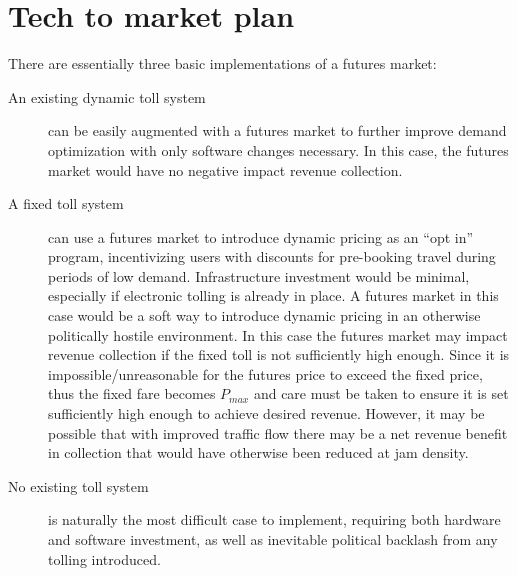 \documentclass{article}
\begin{document}
\section{Tech to market plan}
There are essentially three basic implementations of a futures market:
\begin{description}
    \item[An existing dynamic toll system] can be easily augmented with a futures market to further improve demand optimization with only software changes necessary. In this case, the futures market would have no negative impact revenue collection. 
    
    \item[A fixed toll system] can use a futures market to introduce dynamic pricing as an ``opt in'' program, incentivizing users with discounts for pre-booking travel during periods of low demand. Infrastructure investment would be minimal, especially if electronic tolling is already in place. A futures market in this case would be a soft way to introduce dynamic pricing in an otherwise politically hostile environment. In this case the futures market may impact revenue collection if the fixed toll is not sufficiently high enough. Since it is impossible/unreasonable for the futures price to exceed the fixed price, thus the fixed fare becomes $P_{max}$ and care must be taken to ensure it is set sufficiently high enough to achieve desired revenue. However, it may be possible that with improved traffic flow there may be a net revenue benefit in collection that would have otherwise been reduced at jam density.
    
    \item[No existing toll system] is naturally the most difficult case to implement, requiring both hardware and software investment, as well as inevitable political backlash from any tolling introduced.
\end{description}
\end{document}
